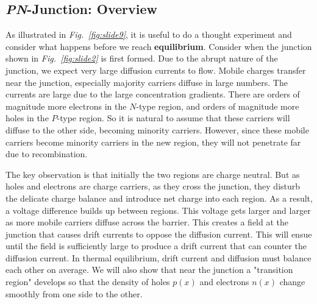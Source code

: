 \subsection{\emph{PN}-Junction: Overview}
As illustrated in \emph{Fig.~\ref{fig:slide9}}, it is useful to do a thought experiment and consider what happens before we reach \textbf{equilibrium}. Consider when the junction shown in \emph{Fig.~\ref{fig:slide2}} is first formed.  Due to the abrupt nature of the junction, we expect very large diffusion currents to flow.  Mobile charges transfer near the junction, especially majority carriers diffuse in large numbers.  The currents are large due to the large concentration gradients.  There are orders of magnitude more electrons in the $N$-type region, and orders of magnitude more holes in the $P$-type region.  So it is natural to assume that these carriers will diffuse to the other side, becoming minority carriers.  However, since these mobile carriers become minority carriers in the new region, they will not penetrate far due to recombination.

The key observation is that initially the two regions are charge neutral.  But as holes and electrons are charge carriers, as they cross the junction, they disturb the delicate charge balance and introduce net charge into each region.  As a result, a voltage difference builds up between regions.  This voltage gets larger and larger as more mobile carriers diffuse across the barrier.   This creates a field at the junction that causes drift currents to oppose the diffusion current.  This will ensue until the field is sufficiently large to produce a drift current that can counter the diffusion current.  In thermal equilibrium, drift current and diffusion must balance each other on average.  We will also show that near the junction a "transition region" develops so that the density of holes $p(x)$ and electrons $n(x)$ change smoothly from one side to the other.
